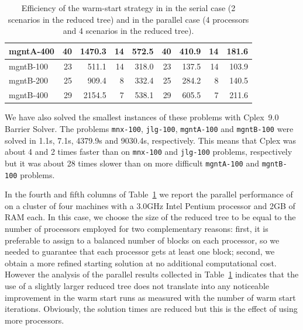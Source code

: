 \begin{table}[ht]
\begin{center}
\begin{tabular}{|l||rr|rr||rr|rr|}
mgntA-400     &   40 & 1470.3 &   14 &  572.5 &  40 &  410.9 &  14 &  181.6 \\
\hline
mgntB-100     &   23 &  511.1 &   14 &  318.0 &  23 &  137.5 &  14 &  103.9 \\
mgntB-200     &   25 &  909.4 &    8 &  332.4 &  25 &  284.2 &   8 &  140.5 \\
mgntB-400     &   29 & 2154.5 &    7 &  538.1 &  29 &  605.5 &   7 &  211.6 \\
\hline
    \end{tabular}
    \caption{Efficiency of the warm-start strategy in \OOPS in the serial
             case (2 scenarios in the reduced tree) and in the parallel case
	     (4 processors and 4 scenarios in the reduced tree).}
    \label{table:oops}
  \end{center} \vspace{-3ex}
\end{table}


We have also solved the smallest instances of these problems 
with Cplex~9.0 Barrier Solver. The problems 
{\tt mnx-100}, {\tt jlg-100}, {\tt mgntA-100} and {\tt mgntB-100} 
were solved in 1.1s, 7.1s, 4379.9s and 9030.4s, respectively.
This means that Cplex was about 4 and 2 times faster than \OOPS
on {\tt mnx-100} and {\tt jlg-100} problems, respectively 
but it was about 28 times slower than \OOPS on more difficult
{\tt mgntA-100} and {\tt mgntB-100} problems.

In the fourth and fifth columns of Table~\ref{table:oops} 
we report the parallel performance 
of \OOPS on a cluster of four machines with a 3.0GHz Intel Pentium 
processor and 2GB of RAM each.
In this case, we choose the size of the reduced tree to be equal 
to the number of processors employed for two complementary reasons: 
first, it is preferable to assign to \OOPS a balanced number of blocks 
on each processor, so we needed to guarantee that each processor 
gets at least one block; second, we obtain a more refined 
starting solution at no additional computational cost. 
However the analysis of the parallel results collected 
in Table~\ref{table:oops}
indicates that the use of a slightly larger reduced tree does not 
translate into any noticeable improvement in the warm start runs 
as measured with the number of warm start iterations.
Obviously, the solution times are reduced but this is the effect 
of using more processors.

